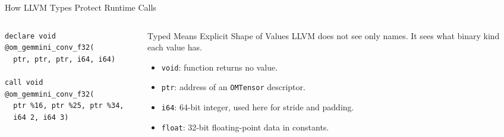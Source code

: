 \documentclass[aspectratio=169,10pt]{beamer}
\newcommand{\code}[1]{\texttt{\footnotesize #1}}
\begin{document}
\begin{frame}[fragile]{How LLVM Types Protect Runtime Calls}
  \begin{columns}[T]
    \begin{column}{0.52\textwidth}
      \begin{lstlisting}
declare void @om_gemmini_conv_f32(
  ptr, ptr, ptr, i64, i64)

call void @om_gemmini_conv_f32(
  ptr %16, ptr %25, ptr %34,
  i64 2, i64 3)
      \end{lstlisting}
    \end{column}
    \begin{column}{0.45\textwidth}
      \begin{block}{Typed Means Explicit Shape of Values}
        LLVM does not see only names. It sees what binary kind each value has.
      \end{block}
      \begin{itemize}
        \item \code{void}: function returns no value.
        \item \code{ptr}: address of an \code{OMTensor} descriptor.
        \item \code{i64}: 64-bit integer, used here for stride and padding.
        \item \code{float}: 32-bit floating-point data in constants.
      \end{itemize}
    \end{column}
  \end{columns}
\end{frame}
\end{document}
